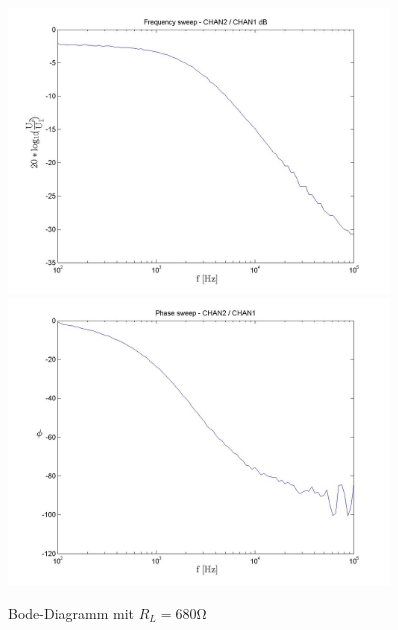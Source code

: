 \documentclass[10pt]{scrreprt}
\begin{document}
\begin{center}
            \begin{figure}[H]
                \centering
                \includegraphics[width=0.9\textwidth]{SchweepVpp_680Ohm_frequencysweep_ylogxlog.jpg}
                \includegraphics[width=0.9\textwidth]{680OhmNett_phasesweep_xlog.jpg}
                \caption{Bode-Diagramm mit $R_L = 680\si{\ohm}$}
            \end{figure}


\end{center}
\end{document}
